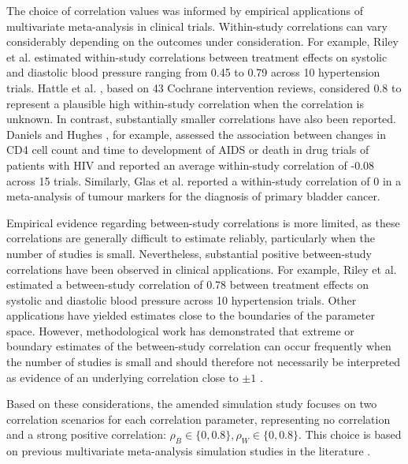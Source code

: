 \documentclass[11pt]{article}
\begin{document}
The choice of correlation values was informed by empirical applications of multivariate meta-analysis in clinical trials. Within-study correlations can vary considerably depending on the outcomes under consideration. For example, Riley et al. \cite{riley2015multivariate} estimated within-study correlations between treatment effects on systolic and diastolic blood pressure ranging from 0.45 to 0.79 across 10 hypertension trials. Hattle et al. \cite{hattle2022multivariate}, based on 43 Cochrane intervention reviews, considered 0.8 to represent a plausible high within-study correlation when the correlation is unknown. In contrast, substantially smaller correlations have also been reported. Daniels and Hughes \cite{daniels1997meta}, for example, assessed the association between changes in CD4 cell count and time to development of AIDS or death in drug trials of patients with HIV and reported an average within-study correlation of -0.08 across 15 trials. Similarly, Glas et al. \cite{glas2003tumor} reported a within-study correlation of 0 in a meta-analysis of tumour markers for the diagnosis of primary bladder cancer. 

Empirical evidence regarding between-study correlations is more limited, as these correlations are generally difficult to estimate reliably, particularly when the number of studies is small. Nevertheless, substantial positive between-study correlations have been observed in clinical applications. For example, Riley et al. \cite{riley2015multivariate} estimated a between-study correlation of 0.78 between treatment effects on systolic and diastolic blood pressure across 10 hypertension trials. Other applications have yielded estimates close to the boundaries of the parameter space. However, methodological work has demonstrated that extreme or boundary estimates of the between-study correlation can occur frequently when the number of studies is small and should therefore not necessarily be interpreted as evidence of an underlying correlation close to $\pm1$ \cite{riley2007bivariate}.

Based on these considerations, the amended simulation study focuses on two correlation scenarios for each correlation parameter, representing no correlation and a strong positive correlation: $\rho_B \in \{0, 0.8\}, \rho_W \in \{0, 0.8\}.$ This choice is based on previous multivariate meta-analysis simulation studies in the literature \cite{kirkham2012multivariate, riley2007bivariate}.
\end{document}
